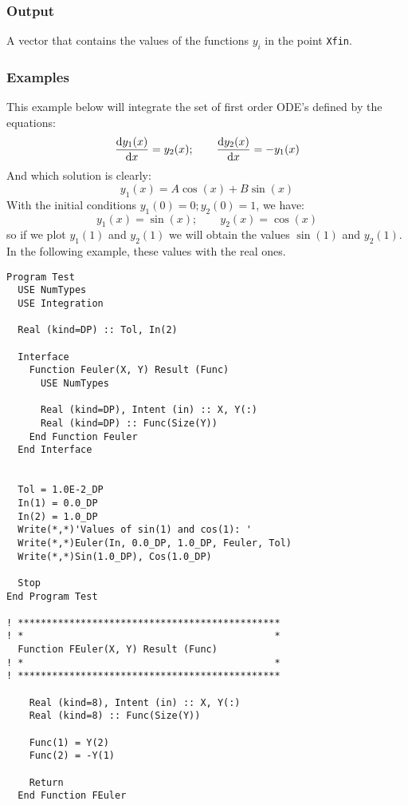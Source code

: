 \subsubsection{Output}

A vector that contains the values of the functions $y_i$ in the point
\texttt{Xfin}. 


\subsubsection{Examples}

This example below will integrate the set of first order ODE's defined
by the equations:
\begin{displaymath}
  \frac{\mathrm{d} y_1(x)}{\mathrm{d} x} = y_2(x);\qquad
  \frac{\mathrm{d} y_2(x)}{\mathrm{d} x} = -y_1(x)    
\end{displaymath}
And which solution is clearly:
\begin{displaymath}
  y_1(x) = A\cos(x) + B\sin(x)
\end{displaymath}
With the initial conditions $y_1(0) = 0; y_2(0)=1$, we have:
\begin{displaymath}
  y_1(x) = \sin(x);\qquad y_2(x) = \cos(x)
\end{displaymath}
so if we plot $y_1(1)$ and $y_2(1)$ we will obtain the values
$\sin(1)$ and $y_2(1)$. In the following example, these values with
the real ones.

\begin{verbatim}
Program Test
  USE NumTypes
  USE Integration

  Real (kind=DP) :: Tol, In(2)

  Interface
    Function Feuler(X, Y) Result (Func)
      USE NumTypes

      Real (kind=DP), Intent (in) :: X, Y(:)
      Real (kind=DP) :: Func(Size(Y))
    End Function Feuler
  End Interface


  Tol = 1.0E-2_DP
  In(1) = 0.0_DP
  In(2) = 1.0_DP
  Write(*,*)'Values of sin(1) and cos(1): '
  Write(*,*)Euler(In, 0.0_DP, 1.0_DP, Feuler, Tol)
  Write(*,*)Sin(1.0_DP), Cos(1.0_DP)

  Stop
End Program Test

! **********************************************  
! *                                            *
  Function FEuler(X, Y) Result (Func)
! *                                            *
! **********************************************

    Real (kind=8), Intent (in) :: X, Y(:)
    Real (kind=8) :: Func(Size(Y))

    Func(1) = Y(2)
    Func(2) = -Y(1)
    
    Return
  End Function FEuler
\end{verbatim}

